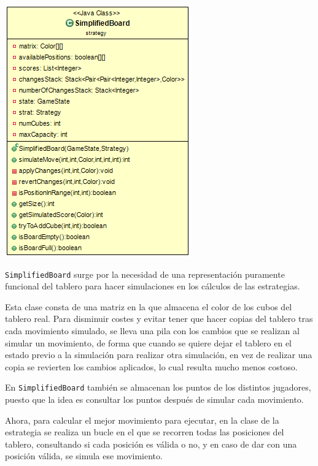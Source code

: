 \documentclass[../DocumentoOficial.tex]{subfiles}
\begin{document}
\begin{center}
\includegraphics[scale=0.75]{SimplifiedBoard-sprint7.png} 
\end{center}

\texttt{SimplifiedBoard} surge por la necesidad de una representación puramente funcional del tablero para hacer simulaciones en los cálculos de las estrategias.

Esta clase consta de una matriz en la que almacena el color de los cubos del tablero real. Para disminuir costes y evitar tener que hacer copias del tablero tras cada movimiento simulado, se lleva una pila con los cambios que se realizan al simular un movimiento, de forma que cuando se quiere dejar el tablero en el estado previo a la simulación para realizar otra simulación, en vez de realizar una copia se revierten los cambios aplicados, lo cual resulta mucho menos costoso.

En \texttt{SimplifiedBoard} también se almacenan los puntos de los distintos jugadores, puesto que la idea es consultar los puntos después de simular cada movimiento.

Ahora, para calcular el mejor movimiento para ejecutar, en la clase de la estrategia se realiza un bucle en el que se recorren todas las posiciones del tablero, consultando si cada posición es válida o no, y en caso de dar con una posición válida, se simula ese movimiento.
\end{document}
